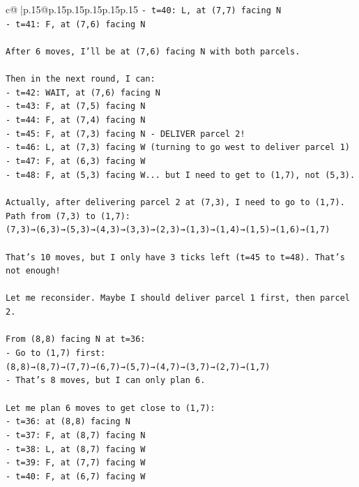 \documentclass{article}
\begin{document}
{\begin{supertabular}{c@{$\;$}|p{.15\linewidth}@{}p{.15\linewidth}p{.15\linewidth}p{.15\linewidth}p{.15\linewidth}p{.15\linewidth}}
{{{\texttt{{-} t=40: L, at (7,7) facing N} \\
\texttt{{-} t=41: F, at (7,6) facing N} \\
\\ 
\texttt{After 6 moves, I'll be at (7,6) facing N with both parcels.} \\
\\ 
\texttt{Then in the next round, I can:} \\
\texttt{{-} t=42: WAIT, at (7,6) facing N} \\
\texttt{{-} t=43: F, at (7,5) facing N} \\
\texttt{{-} t=44: F, at (7,4) facing N} \\
\texttt{{-} t=45: F, at (7,3) facing N {-} DELIVER parcel 2!} \\
\texttt{{-} t=46: L, at (7,3) facing W (turning to go west to deliver parcel 1)} \\
\texttt{{-} t=47: F, at (6,3) facing W} \\
\texttt{{-} t=48: F, at (5,3) facing W... but I need to get to (1,7), not (5,3).} \\
\\ 
\texttt{Actually, after delivering parcel 2 at (7,3), I need to go to (1,7). Path from (7,3) to (1,7): (7,3)→(6,3)→(5,3)→(4,3)→(3,3)→(2,3)→(1,3)→(1,4)→(1,5)→(1,6)→(1,7)} \\
\\ 
\texttt{That's 10 moves, but I only have 3 ticks left (t=45 to t=48). That's not enough!} \\
\\ 
\texttt{Let me reconsider. Maybe I should deliver parcel 1 first, then parcel 2.} \\
\\ 
\texttt{From (8,8) facing N at t=36:} \\
\texttt{{-} Go to (1,7) first: (8,8)→(8,7)→(7,7)→(6,7)→(5,7)→(4,7)→(3,7)→(2,7)→(1,7)} \\
\texttt{{-} That's 8 moves, but I can only plan 6.} \\
\\ 
\texttt{Let me plan 6 moves to get close to (1,7):} \\
\texttt{{-} t=36: at (8,8) facing N} \\
\texttt{{-} t=37: F, at (8,7) facing N} \\
\texttt{{-} t=38: L, at (8,7) facing W} \\
\texttt{{-} t=39: F, at (7,7) facing W} \\
\texttt{{-} t=40: F, at (6,7) facing W} \\
}}}
\end{supertabular}}
\end{document}
